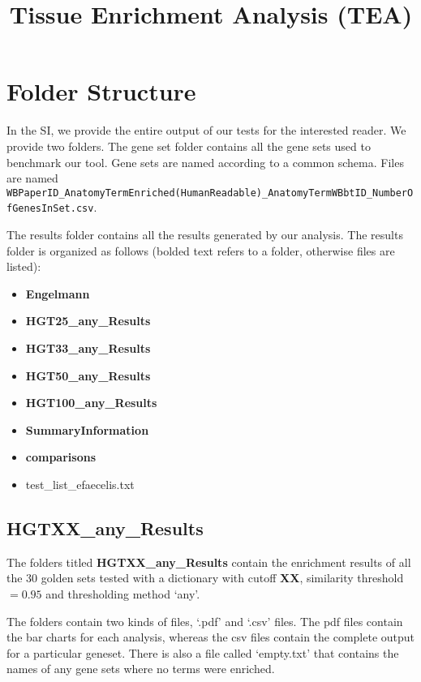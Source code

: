 \documentclass{article}
\begin{document}

\title{Tissue Enrichment Analysis (TEA)}


\section*{Folder Structure}

In the SI, we provide the entire output of our tests for the interested reader. We provide two folders. The gene set folder contains all the gene sets used to benchmark our tool. Gene sets are named according to a common schema. Files are named\\ \texttt{WBPaperID\_AnatomyTermEnriched(HumanReadable)\_AnatomyTermWBbtID\_NumberOfGenesInSet.csv}.

The results folder contains all the results generated by our analysis. The results folder is organized as follows (bolded text refers to a folder, otherwise files are listed):

\begin{itemize}
	\item \textbf{Engelmann}
	\item \textbf{HGT25\_any\_Results}
	\item \textbf{HGT33\_any\_Results}
	\item \textbf{HGT50\_any\_Results}
	\item \textbf{HGT100\_any\_Results}
	\item \textbf{SummaryInformation}
	\item \textbf{comparisons}
	\item test\_list\_efaecelis.txt
\end{itemize}

\subsection*{HGTXX\_any\_Results}
The folders titled \textbf{HGTXX\_any\_Results} contain the enrichment results of all the 30 golden sets tested with a dictionary with cutoff \textbf{XX}, similarity threshold$=0.95$ and thresholding method `any'. 


The folders contain two kinds of files, `.pdf' and `.csv' files. The pdf files contain the bar charts for each analysis, whereas the csv files contain the complete output for a particular geneset. There is also a file called `empty.txt' that contains the names of any gene sets where no terms were enriched.
\end{document}
